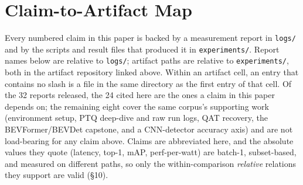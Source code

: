 \documentclass[11pt]{article}
\begin{document}



\appendix

\section{Claim-to-Artifact Map}
\label{app:map}

Every numbered claim in this paper is backed by a measurement report in \texttt{logs/} and by the scripts and result files that produced it in \texttt{experiments/}. Report names below are relative to \texttt{logs/}; artifact paths are relative to \texttt{experiments/}, both in the artifact repository linked above. Within an artifact cell, an entry that contains no slash is a file in the same directory as the first entry of that cell. Of the 32 reports released, the 24 cited here are the ones a claim in this paper depends on; the remaining eight cover the same corpus's supporting work (environment setup, PTQ deep-dive and raw run logs, QAT recovery, the BEVFormer/BEVDet capstone, and a CNN-detector accuracy axis) and are not load-bearing for any claim above. Claims are abbreviated here, and the absolute values they quote (latency, top-1, mAP, perf-per-watt) are batch-1, subset-based, and measured on different paths, so only the within-comparison \emph{relative} relations they support are valid (\S10).
\end{document}
